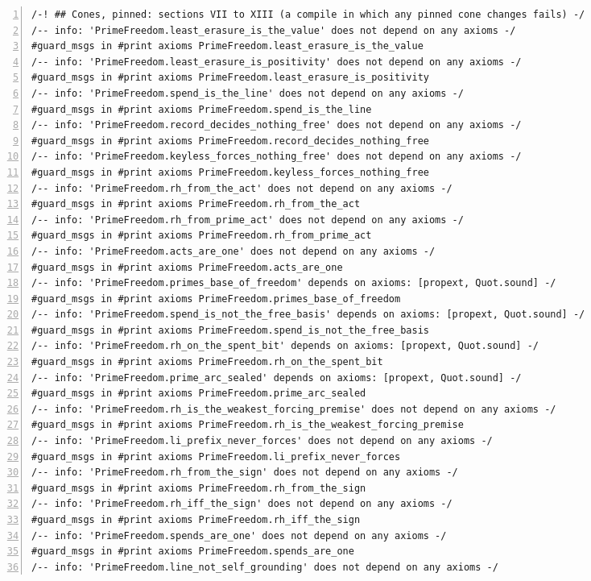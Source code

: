 \documentclass[10pt]{article}
\newcommand{\leansize}{\fontsize{5.5pt}{6.75pt}\selectfont}
\begin{document}
\begin{multicols}{2}
\begin{Verbatim}[numbers=left,firstnumber=1,numbersep=3pt,xleftmargin=2.6em,breaklines=true,breakanywhere=true,breakautoindent=false,breakindent=1.4em,breaksymbolleft={},breakanywheresymbolpre={},fontsize=\leansize]
/-! ## Cones, pinned: sections VII to XIII (a compile in which any pinned cone changes fails) -/
/-- info: 'PrimeFreedom.least_erasure_is_the_value' does not depend on any axioms -/
#guard_msgs in #print axioms PrimeFreedom.least_erasure_is_the_value
/-- info: 'PrimeFreedom.least_erasure_is_positivity' does not depend on any axioms -/
#guard_msgs in #print axioms PrimeFreedom.least_erasure_is_positivity
/-- info: 'PrimeFreedom.spend_is_the_line' does not depend on any axioms -/
#guard_msgs in #print axioms PrimeFreedom.spend_is_the_line
/-- info: 'PrimeFreedom.record_decides_nothing_free' does not depend on any axioms -/
#guard_msgs in #print axioms PrimeFreedom.record_decides_nothing_free
/-- info: 'PrimeFreedom.keyless_forces_nothing_free' does not depend on any axioms -/
#guard_msgs in #print axioms PrimeFreedom.keyless_forces_nothing_free
/-- info: 'PrimeFreedom.rh_from_the_act' does not depend on any axioms -/
#guard_msgs in #print axioms PrimeFreedom.rh_from_the_act
/-- info: 'PrimeFreedom.rh_from_prime_act' does not depend on any axioms -/
#guard_msgs in #print axioms PrimeFreedom.rh_from_prime_act
/-- info: 'PrimeFreedom.acts_are_one' does not depend on any axioms -/
#guard_msgs in #print axioms PrimeFreedom.acts_are_one
/-- info: 'PrimeFreedom.primes_base_of_freedom' depends on axioms: [propext, Quot.sound] -/
#guard_msgs in #print axioms PrimeFreedom.primes_base_of_freedom
/-- info: 'PrimeFreedom.spend_is_not_the_free_basis' depends on axioms: [propext, Quot.sound] -/
#guard_msgs in #print axioms PrimeFreedom.spend_is_not_the_free_basis
/-- info: 'PrimeFreedom.rh_on_the_spent_bit' depends on axioms: [propext, Quot.sound] -/
#guard_msgs in #print axioms PrimeFreedom.rh_on_the_spent_bit
/-- info: 'PrimeFreedom.prime_arc_sealed' depends on axioms: [propext, Quot.sound] -/
#guard_msgs in #print axioms PrimeFreedom.prime_arc_sealed
/-- info: 'PrimeFreedom.rh_is_the_weakest_forcing_premise' does not depend on any axioms -/
#guard_msgs in #print axioms PrimeFreedom.rh_is_the_weakest_forcing_premise
/-- info: 'PrimeFreedom.li_prefix_never_forces' does not depend on any axioms -/
#guard_msgs in #print axioms PrimeFreedom.li_prefix_never_forces
/-- info: 'PrimeFreedom.rh_from_the_sign' does not depend on any axioms -/
#guard_msgs in #print axioms PrimeFreedom.rh_from_the_sign
/-- info: 'PrimeFreedom.rh_iff_the_sign' does not depend on any axioms -/
#guard_msgs in #print axioms PrimeFreedom.rh_iff_the_sign
/-- info: 'PrimeFreedom.spends_are_one' does not depend on any axioms -/
#guard_msgs in #print axioms PrimeFreedom.spends_are_one
/-- info: 'PrimeFreedom.line_not_self_grounding' does not depend on any axioms -/

\end{Verbatim}
\end{multicols}
\end{document}
